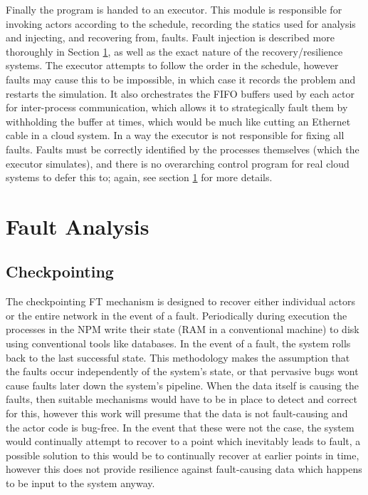 Finally the program is handed to an executor.
This module is responsible for invoking actors according to the schedule, recording the statics used for analysis and injecting, and recovering from, faults.
Fault injection is described more thoroughly in Section \ref{secSystemFault}, as well as the exact nature of the recovery/resilience systems.
The executor attempts to follow the order in the schedule, however faults may cause this to be impossible, in which case it records the problem and restarts the simulation.
It also orchestrates the FIFO buffers used by each actor for inter-process communication, which allows it to strategically fault them by withholding the buffer at times, which would be much like cutting an Ethernet cable in a cloud system.
In a way the executor is not responsible for fixing all faults.
Faults must be correctly identified by the processes themselves (which the executor simulates), and there is no overarching control program for real cloud systems to defer this to; again, see section \ref{secSystemFault} for more details.

\section{Fault Analysis}
\label{secSystemFault}
\subsection{Checkpointing}

The checkpointing FT mechanism is designed to recover either individual actors or the entire network in the event of a fault.
Periodically during execution the processes in the NPM write their state (RAM in a conventional machine) to disk using conventional tools like databases.
In the event of a fault, the system rolls back to the last successful state.
This methodology makes the assumption that the faults occur independently of the system's state, or that pervasive bugs wont cause faults later down the system's pipeline.
When the data itself is causing the faults, then suitable mechanisms would have to be in place to detect and correct for this, however this work will presume that the data is not fault-causing and the actor code is bug-free.
In the event that these were not the case, the system would continually attempt to recover to a point which inevitably leads to fault, a possible solution to this would be to continually recover at earlier points in time, however this does not provide resilience against fault-causing data which happens to be input to the system anyway.

